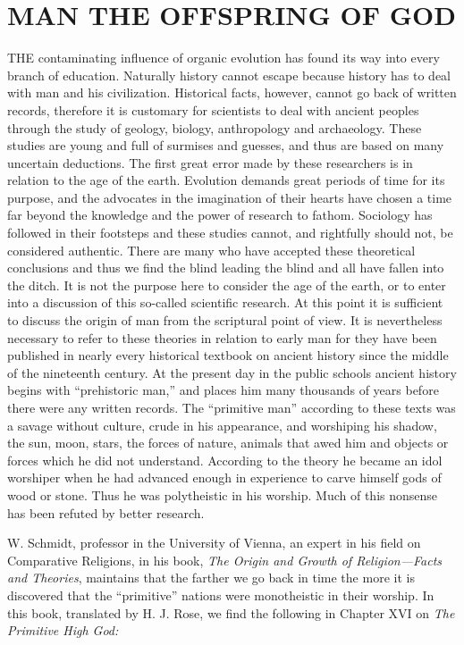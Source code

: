 \chapter{MAN THE OFFSPRING OF GOD}

THE contaminating influence of organic evolution has found its way into every branch of
education. Naturally history cannot escape because history has to deal with man and his
civilization. Historical facts, however, cannot go back of written records, therefore it is
customary for scientists to deal with ancient peoples through the study of geology, biology,
anthropology and archaeology. These studies are young and full of surmises and guesses, and
thus are based on many uncertain deductions. The first great error made by these researchers
is in relation to the age of the earth. Evolution demands great periods of time for its purpose,
and the advocates in the imagination of their hearts have chosen a time far beyond the
knowledge and the power of research to fathom. Sociology has followed in their footsteps
and these studies cannot, and rightfully should not, be considered authentic. There are many
who have accepted these theoretical conclusions and thus we find the blind leading the blind
and all have fallen into the ditch. It is not the purpose here to consider the age of the earth, or
to enter into a discussion of this so-called scientific research. At this point it is sufficient to
discuss the origin of man from the scriptural point of view. It is nevertheless necessary to
refer to these theories in relation to early man for they have been published in nearly every
historical textbook on ancient history since the middle of the nineteenth century. At the
present day in the public schools ancient history begins with ``prehistoric man,'' and places
him many thousands of years before there were any written records. The ``primitive man''
according to these texts was a savage without culture, crude in his appearance, and
worshiping his shadow, the sun, moon, stars, the forces of nature, animals that awed him and
objects or forces which he did not understand. According to the theory he became an idol
worshiper when he had advanced enough in experience to carve himself gods of wood or
stone. Thus he was polytheistic in his worship. Much of this nonsense has been refuted by
better research.

W. Schmidt, professor in the University of Vienna, an expert in his field on Comparative
Religions, in his book, \textit{The Origin and Growth of Religion—Facts and Theories}, maintains
that the farther we go back in time the more it is discovered that the ``primitive'' nations were
monotheistic in their worship. In this book, translated by H. J. Rose, we find the following in
Chapter XVI on \textit{The Primitive High God:}

